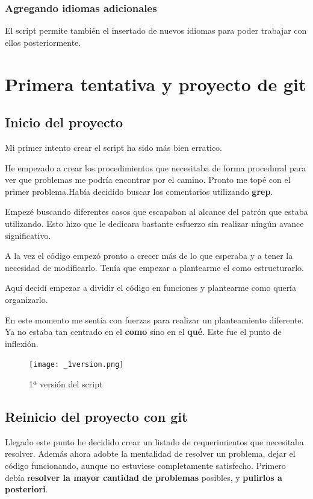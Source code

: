 \documentclass{article}
\begin{document}
        \subsubsection{Agregando idiomas adicionales}
            El script permite también el insertado de nuevos idiomas para poder trabajar con ellos posteriormente.
\newpage
\section{Primera tentativa y proyecto de git}
    \subsection{Inicio del proyecto}
        Mi primer intento crear el script ha sido más bien erratico.
        
        He empezado a crear los procedimientos que necesitaba de forma procedural para ver que problemas me podría encontrar por el camino. Pronto me topé con el primer problema.Había decidido buscar los comentarios utilizando \textbf{grep}.
        
        Empezé buscando diferentes casos que escapaban al alcance del patrón que estaba utilizando. Esto hizo que le dedicara bastante esfuerzo sin realizar ningún avance significativo.
    
        A la vez el código empezó pronto a crecer más de lo que esperaba y a tener la necesidad de modificarlo. Tenía que empezar a plantearme el como estructurarlo.
    
        Aquí decidí empezar a dividir el código en funciones y plantearme como quería organizarlo.
    
        En este momento me sentía con fuerzas para realizar un planteamiento diferente. Ya no estaba tan centrado en el \textbf{como} sino en el \textbf{qué}. Este fue el punto de inflexión.

        \begin{figure}
            \centering
            \texttt{[image: \_1version.png]}
            \caption{1ª versión del script}
        \end{figure}

    \subsection{Reinicio del proyecto con git}
        Llegado este punto he decidido crear un listado de requerimientos que necesitaba resolver. Además ahora adobte la mentalidad de resolver un problema, dejar el código funcionando, aunque no estuviese completamente satisfecho. Primero debía r\textbf{esolver la mayor cantidad de problemas} posibles, y \textbf{pulirlos a posteriori}.
        
\end{document}
